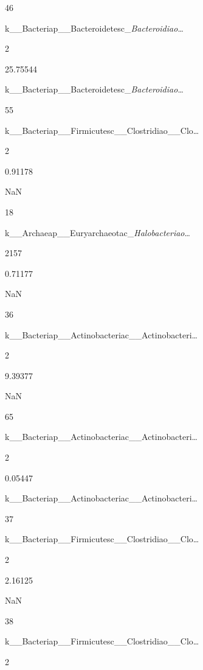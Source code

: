 \documentclass[
  letterpaper,
]{book}
\begin{document}
46

k\_\_Bacteria\textbar p\_\_Bacteroidetes\textbar c\_\emph{Bacteroidia\textbar o}\ldots{}

2

25.75544

k\_\_Bacteria\textbar p\_\_Bacteroidetes\textbar c\_\emph{Bacteroidia\textbar o}\ldots{}

55

k\_\_Bacteria\textbar p\_\_Firmicutes\textbar c\_\_Clostridia\textbar o\_\_Clo\ldots{}

2

0.91178

NaN

18

k\_\_Archaea\textbar p\_\_Euryarchaeota\textbar c\_\emph{Halobacteria\textbar o}\ldots{}

2157

0.71177

NaN

36

k\_\_Bacteria\textbar p\_\_Actinobacteria\textbar c\_\_Actinobacteri\ldots{}

2

9.39377

NaN

65

k\_\_Bacteria\textbar p\_\_Actinobacteria\textbar c\_\_Actinobacteri\ldots{}

2

0.05447

k\_\_Bacteria\textbar p\_\_Actinobacteria\textbar c\_\_Actinobacteri\ldots{}

37

k\_\_Bacteria\textbar p\_\_Firmicutes\textbar c\_\_Clostridia\textbar o\_\_Clo\ldots{}

2\textbar{}

2.16125

NaN

38

k\_\_Bacteria\textbar p\_\_Firmicutes\textbar c\_\_Clostridia\textbar o\_\_Clo\ldots{}

2
\end{document}
